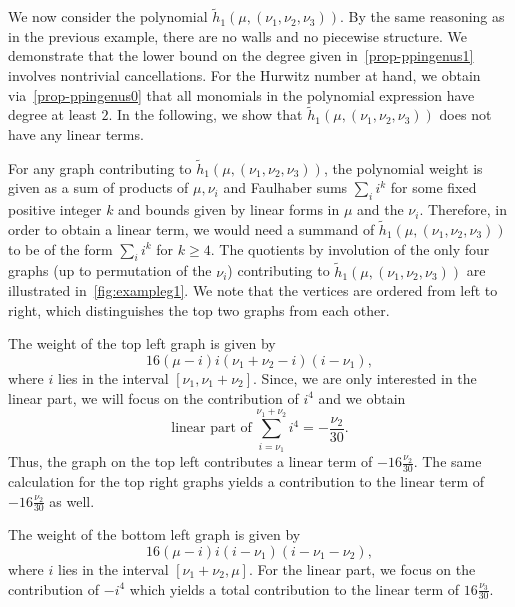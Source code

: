\begin{exam}\label{ex-linearpart}
We now consider the polynomial $\tilde{h}_1(\mu,(\nu_1,\nu_2,\nu_3))$. By the same reasoning as in the previous example, there are no walls and no piecewise structure. We demonstrate that the lower bound on the degree given in~\cref{prop-ppingenus1} involves nontrivial cancellations. For the Hurwitz number at hand, we obtain via~\cref{prop-ppingenus0} that all monomials in the polynomial expression have degree at least $2$. In the following, we show that $\tilde{h}_1(\mu,(\nu_1,\nu_2,\nu_3))$ does not have any linear terms.

For any graph contributing to $\tilde{h}_1(\mu,(\nu_1,\nu_2,\nu_3))$, the polynomial weight is given as a sum of products of $\mu,\nu_i$ and Faulhaber sums $\sum_i i^k$ for some fixed positive integer $k$ and bounds given by linear forms in $\mu$ and the $\nu_i$. Therefore, in order to obtain a linear term, we would need a summand of $\tilde{h}_1(\mu,(\nu_1,\nu_2,\nu_3))$ to be of the form $\sum_i i^k$ for $k\ge 4$. The quotients by involution of the only four graphs (up to permutation of the $\nu_i$) contributing to $\tilde{h}_1(\mu,(\nu_1,\nu_2,\nu_3))$ are illustrated in~\cref{fig:exampleg1}. We note that the vertices are ordered from left to right, which distinguishes the top two graphs from each other.

The weight of the top left graph is given by
\begin{equation*}
    16(\mu-i)i(\nu_1+\nu_2-i)(i-\nu_1),
\end{equation*}
where $i$ lies in the interval $[\nu_1,\nu_1+\nu_2]$.
Since, we are only interested in the linear part, we will focus on the contribution of $i^4$ and we obtain
\begin{equation*}
    \textrm{linear part of}\,\sum_{i=\nu_1}^{\nu_1+\nu_2}i^4=-\frac{\nu_2}{30}.
\end{equation*}
Thus, the graph on the top left contributes a linear term of $-16\frac{\nu_2}{30}$.
The same calculation for the top right graphs yields a contribution to the linear term of $-16\frac{\nu_2}{30}$ as well.

The weight of the bottom left graph is given by
\begin{equation*}
    16(\mu-i)i(i-\nu_1)(i-\nu_1-\nu_2),
\end{equation*}
where $i$ lies in the interval $[\nu_1+\nu_2,\mu]$. For the linear part, we focus on the contribution of $-i^4$ which yields a total contribution to the linear term of $16\frac{\nu_3}{30}$.


\end{exam}
